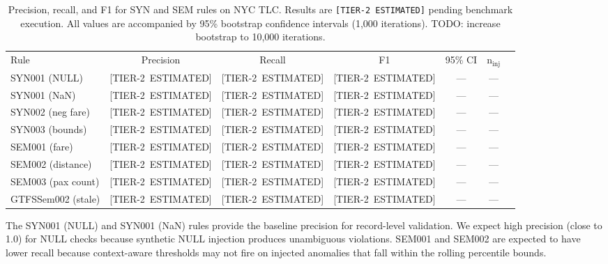 \begin{table}[htbp]
  \centering
  \caption{Precision, recall, and F1 for SYN and SEM rules on NYC TLC.
    Results are \texttt{[TIER-2\ ESTIMATED]} pending benchmark execution.
    All values are accompanied by 95\% bootstrap confidence intervals
    (1,000 iterations). TODO: increase bootstrap to 10,000 iterations.}
  \label{tab:results-syn-sem}
  \begin{tabular}{lcccccc}
    \toprule
    \multirow{2}{*}{Rule} & \multirow{2}{*}{Precision} & \multirow{2}{*}{Recall}
    & \multirow{2}{*}{F1} & \multirow{2}{*}{95\% CI} &
    \multirow{2}{*}{n$_{\text{inj}}$} \\
    & & & & & \\
    \midrule
    SYN001 (NULL)      & [TIER-2\ ESTIMATED] & [TIER-2\ ESTIMATED]
                       & [TIER-2\ ESTIMATED] & — & — \\[4pt]
    SYN001 (NaN)       & [TIER-2\ ESTIMATED] & [TIER-2\ ESTIMATED]
                       & [TIER-2\ ESTIMATED] & — & — \\[4pt]
    SYN002 (neg fare)   & [TIER-2\ ESTIMATED] & [TIER-2\ ESTIMATED]
                       & [TIER-2\ ESTIMATED] & — & — \\[4pt]
    SYN003 (bounds)    & [TIER-2\ ESTIMATED] & [TIER-2\ ESTIMATED]
                       & [TIER-2\ ESTIMATED] & — & — \\[4pt]
    SEM001 (fare)      & [TIER-2\ ESTIMATED] & [TIER-2\ ESTIMATED]
                       & [TIER-2\ ESTIMATED] & — & — \\[4pt]
    SEM002 (distance)  & [TIER-2\ ESTIMATED] & [TIER-2\ ESTIMATED]
                       & [TIER-2\ ESTIMATED] & — & — \\[4pt]
    SEM003 (pax count) & [TIER-2\ ESTIMATED] & [TIER-2\ ESTIMATED]
                       & [TIER-2\ ESTIMATED] & — & — \\[4pt]
    GTFSSem002 (stale) & [TIER-2\ ESTIMATED] & [TIER-2\ ESTIMATED]
                       & [TIER-2\ ESTIMATED] & — & — \\
    \bottomrule
  \end{tabular}
\end{table}

The SYN001 (NULL) and SYN001 (NaN) rules provide the baseline precision
for record-level validation. We expect high precision (close to 1.0) for
NULL checks because synthetic NULL injection produces unambiguous violations.
SEM001 and SEM002 are expected to have lower recall because context-aware
thresholds may not fire on injected anomalies that fall within the rolling
percentile bounds.

